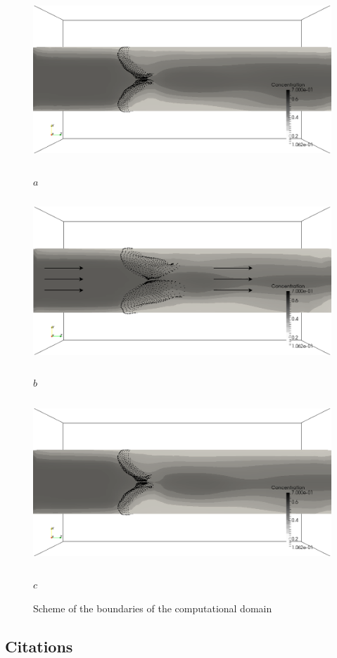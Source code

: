 \documentclass[runningheads,a4paper]{llncs}
\begin{document}
\begin{figure}
\centering
\includegraphics[height=6.2cm]{images/valves_in_mixture_gray_scale_400.png}

$a$

\includegraphics[height=6.2cm]{images/valves_in_mixture_gray_scale_500.png}

$b$

\includegraphics[height=6.2cm]{images/valves_in_mixture_gray_scale_600.png}

$c$

\caption{Scheme of the boundaries of the computational domain}
\label{fig:valve_in_mixture_1}
\end{figure}


\subsection{Citations}
\end{document}
